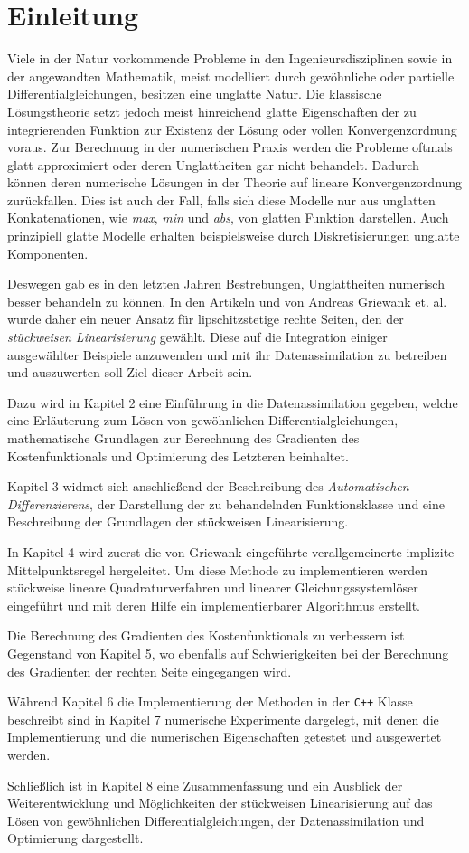 \chapter{Einleitung}
Viele in der Natur vorkommende Probleme in den Ingenieursdisziplinen sowie in der angewandten Mathematik, meist modelliert durch gewöhnliche oder partielle Differentialgleichungen, besitzen eine unglatte Natur. Die klassische Lösungstheorie setzt jedoch meist hinreichend glatte Eigenschaften der zu integrierenden Funktion zur Existenz der Lösung oder vollen Konvergenzordnung voraus. Zur Berechnung in der numerischen Praxis werden die Probleme oftmals glatt approximiert oder deren Unglattheiten gar nicht behandelt. Dadurch können deren numerische Lösungen in der Theorie auf lineare Konvergenzordnung zurückfallen. Dies ist auch der Fall, falls sich diese Modelle nur aus unglatten Konkatenationen, wie \textit{max}, \textit{min} und \textit{abs}, von glatten Funktion darstellen. Auch prinzipiell glatte Modelle erhalten beispielsweise durch Diskretisierungen unglatte Komponenten. 

Deswegen gab es in den letzten Jahren Bestrebungen, Unglattheiten numerisch besser behandeln zu können. In den Artikeln \cite{monster} und \cite{plan} von Andreas Griewank et. al. wurde daher ein neuer Ansatz für lipschitzstetige rechte Seiten, den der \textit{stückweisen Linearisierung} gewählt. Diese auf die Integration einiger ausgewählter Beispiele anzuwenden und mit ihr Datenassimilation zu betreiben und auszuwerten soll Ziel dieser Arbeit sein.

Dazu wird in Kapitel 2 eine Einführung in die Datenassimilation gegeben, welche eine Erläuterung zum Lösen von gewöhnlichen Differentialgleichungen, mathematische Grundlagen zur Berechnung des Gradienten des Kostenfunktionals und Optimierung des Letzteren beinhaltet.

Kapitel 3 widmet sich anschließend der Beschreibung des \textit{Automatischen Differenzierens}, der Darstellung der zu behandelnden Funktionsklasse und eine Beschreibung der Grundlagen der stückweisen Linearisierung.

In Kapitel 4 wird zuerst die von Griewank eingeführte verallgemeinerte implizite Mittelpunktsregel hergeleitet. Um diese Methode zu implementieren werden stückweise lineare Quadraturverfahren und linearer Gleichungssystemlöser eingeführt und mit deren Hilfe ein implementierbarer Algorithmus erstellt.

Die Berechnung des Gradienten des Kostenfunktionals zu verbessern ist Gegenstand von Kapitel 5, wo ebenfalls auf Schwierigkeiten bei der Berechnung des Gradienten der rechten Seite eingegangen wird. 

Während Kapitel 6 die Implementierung der Methoden in der \texttt{C++} Klasse  beschreibt sind in Kapitel 7 numerische Experimente dargelegt, mit denen die Implementierung und die numerischen Eigenschaften getestet und ausgewertet werden.

Schließlich ist in Kapitel 8 eine Zusammenfassung und ein Ausblick der Weiterentwicklung und Möglichkeiten der stückweisen Linearisierung auf das Lösen von gewöhnlichen Differentialgleichungen, der Datenassimilation und Optimierung dargestellt.